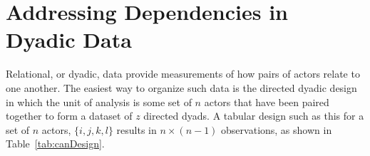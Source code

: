 \documentclass[12pt,pdflatex]{elsarticle}
\begin{document}
\section{\textbf{Addressing Dependencies in Dyadic Data}}

Relational, or dyadic, data provide measurements of how pairs of actors relate to one another. 
The easiest way to organize such data is the directed dyadic design in which the unit of analysis is some set of $n$ actors that have been paired together to form a dataset of $z$ directed dyads. A tabular design such as this for a set of $n$ actors, $\{i, j, k, l \}$ results in $n \times (n-1)$ observations, as shown in Table~\ref{tab:canDesign}. 
\end{document}
